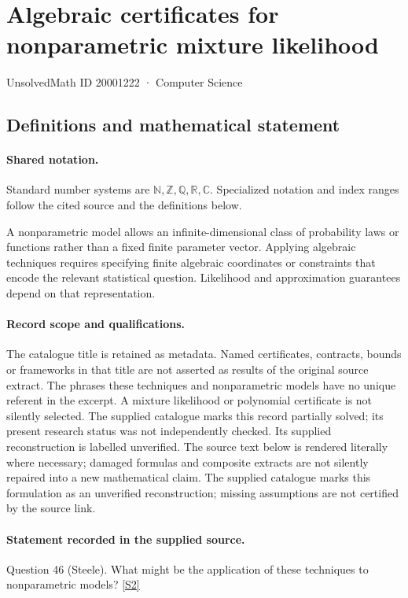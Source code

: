 \documentclass[11pt]{article}
\newcommand{\sref}[2]{\hyperlink{source:#1:#2}{[S#2]}}
\begin{document}
\setcounter{section}{20001221}
\section{Algebraic certificates for nonparametric mixture likelihood}\label{20001222}
{\small\sffamily UnsolvedMath ID 20001222 · Computer Science}
\subsection{Definitions and mathematical statement}

\paragraph{Shared notation.}Standard number systems are $\mathbb N,\mathbb Z,\mathbb Q,\mathbb R,\mathbb C$. Specialized notation and index ranges follow the cited source and the definitions below.


A nonparametric model allows an infinite-dimensional class of probability laws or functions rather than a fixed finite parameter vector. Applying algebraic techniques requires specifying finite algebraic coordinates or constraints that encode the relevant statistical question. Likelihood and approximation guarantees depend on that representation.
\paragraph{Record scope and qualifications.}
The catalogue title is retained as metadata. Named certificates, contracts, bounds or frameworks in that title are not asserted as results of the original source extract.
The phrases these techniques and nonparametric models have no unique referent in the excerpt. A mixture likelihood or polynomial certificate is not silently selected. The supplied catalogue marks this record partially solved; its present research status was not independently checked. Its supplied reconstruction is labelled unverified.
The source text below is rendered literally where necessary; damaged formulas and composite extracts are not silently repaired into a new mathematical claim.
The supplied catalogue marks this formulation as an unverified reconstruction; missing assumptions are not certified by the source link.
\paragraph{Statement recorded in the supplied source.}
Question 46 (Steele). What might be the application of these techniques to nonparametric models? \sref{20001222}{2}
\end{document}
